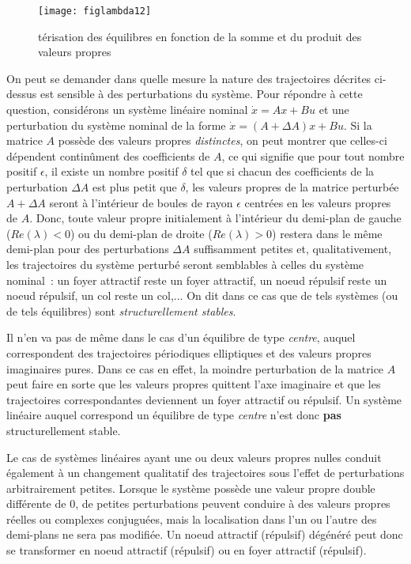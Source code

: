 \begin{figure}[htbp]
   \centering
   \texttt{[image: figlambda12]} 
   \caption{
   t{é}risation des {é}quilibres en fonction de la somme et du
produit des valeurs propres}
   \label{fig:figlambda12}
\end{figure}

On peut se demander dans quelle mesure la nature des trajectoires d{é}crites
ci-dessus est sensible {à} des perturbations du syst{è}me. Pour répondre à cette question, considérons un syst{è}me lin{é}aire nominal $\dot x=
A x+Bu$ et une perturbation du syst{è}me nominal de la forme $\dot x= (A+\Delta A) x+Bu$. Si la matrice $A$ poss{è}de des valeurs
propres {\em distinctes}, on peut montrer que celles-ci d{é}pendent contin{\^u}ment
des coefficients de $A$, ce qui signifie que pour tout nombre positif
$\epsilon$, il existe un nombre positif $\delta$ tel que si chacun des
coefficients de la perturbation $\Delta A$ est plus petit que $\delta$, les
valeurs propres de la matrice perturb{é}e $A+\Delta A$ seront {à}
l'int{é}rieur de boules de rayon $\epsilon$ centr{é}es en les valeurs
propres de $A$. Donc, toute valeur propre initialement {à} l'int{é}rieur du
demi-plan de gauche ($Re(\lambda)<0$) ou du demi-plan de droite
($Re(\lambda)>0$) restera dans le m{ê}me demi-plan pour des perturbations
$\Delta A$ suffisamment petites et, qualitativement, les trajectoires du
syst{è}me perturb{é} seront semblables {à} celles du syst{è}me nominal~:
un foyer
attractif reste un foyer attractif, un noeud répulsif reste un noeud répulsif, un col reste un col,... On dit dans ce cas que de tels syst{è}mes (ou de tels {é}quilibres) sont {\em
structurellement stables}. 

Il n'en va pas de m{ê}me dans le cas d'un
{é}quilibre de type {\em centre}, auquel correspondent des trajectoires
p{é}riodiques elliptiques et des valeurs propres imaginaires pures. Dans ce
cas en effet, la moindre perturbation de la matrice $A$ peut faire en sorte
que les valeurs propres quittent l'axe imaginaire et que les trajectoires
correspondantes deviennent un foyer attractif ou répulsif. Un syst{è}me
lin{é}aire auquel correspond un {é}quilibre de type {\em centre} n'est donc
{\bf pas} structurellement stable. 

Le cas de syst{è}mes lin{é}aires ayant
une ou deux valeurs propres nulles conduit {é}galement {à} un changement
qualitatif des trajectoires sous l'effet de perturbations arbitrairement
petites. Lorsque le syst{è}me poss{è}de une valeur propre double
diff{é}rente de $0$, de petites perturbations peuvent conduire {à} des valeurs
propres r{é}elles ou complexes conjugu{é}es, mais la localisation dans l'un
ou l'autre des demi-plans ne sera pas modifi{é}e. Un noeud attractif (répulsif)
d{é}g{é}n{é}r{é} peut donc se transformer en noeud attractif (répulsif) ou en
foyer attractif (répulsif).

